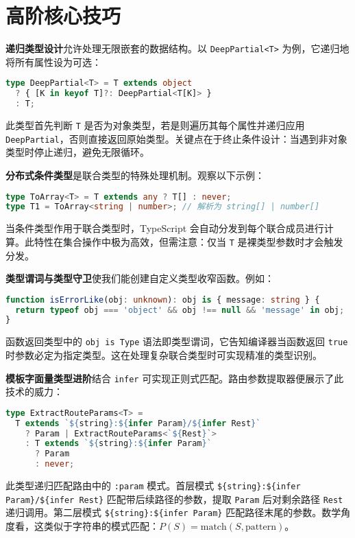 \section{高阶核心技巧}
\textbf{递归类型设计}允许处理无限嵌套的数据结构。以 \texttt{DeepPartial<T>} 为例，它递归地将所有属性设为可选：\par
\begin{lstlisting}[language=typescript]
type DeepPartial<T> = T extends object 
  ? { [K in keyof T]?: DeepPartial<T[K]> } 
  : T;
\end{lstlisting}
此类型首先判断 \texttt{T} 是否为对象类型，若是则遍历其每个属性并递归应用 \texttt{DeepPartial}，否则直接返回原始类型。关键点在于终止条件设计：当遇到非对象类型时停止递归，避免无限循环。\par
\textbf{分布式条件类型}是联合类型的特殊处理机制。观察以下示例：\par
\begin{lstlisting}[language=typescript]
type ToArray<T> = T extends any ? T[] : never;
type T1 = ToArray<string | number>; // 解析为 string[] | number[]
\end{lstlisting}
当条件类型作用于联合类型时，TypeScript 会自动分发到每个联合成员进行计算。此特性在集合操作中极为高效，但需注意：仅当 \texttt{T} 是裸类型参数时才会触发分发。\par
\textbf{类型谓词与类型守卫}使我们能创建自定义类型收窄函数。例如：\par
\begin{lstlisting}[language=typescript]
function isErrorLike(obj: unknown): obj is { message: string } {
  return typeof obj === 'object' && obj !== null && 'message' in obj;
}
\end{lstlisting}
函数返回类型中的 \texttt{obj is Type} 语法即类型谓词，它告知编译器当函数返回 \texttt{true} 时参数必定为指定类型。这在处理复杂联合类型时可实现精准的类型识别。\par
\textbf{模板字面量类型进阶}结合 \texttt{infer} 可实现正则式匹配。路由参数提取器便展示了此技术的威力：\par
\begin{lstlisting}[language=typescript]
type ExtractRouteParams<T> = 
  T extends `${string}:${infer Param}/${infer Rest}`
    ? Param | ExtractRouteParams<`${Rest}`>
    : T extends `${string}:${infer Param}`
      ? Param
      : never;
\end{lstlisting}
此类型递归匹配路由中的 \texttt{:param} 模式。首层模式 \texttt{\${}\{{}string\}{}:\${}\{{}infer Param\}{}/\${}\{{}infer Rest\}{}} 匹配带后续路径的参数，提取 \texttt{Param} 后对剩余路径 \texttt{Rest} 递归调用。第二层模式 \texttt{\${}\{{}string\}{}:\${}\{{}infer Param\}{}} 匹配路径末尾的参数。数学角度看，这类似于字符串的模式匹配：$P(S) = \text{match}(S, \text{pattern})$。\par
